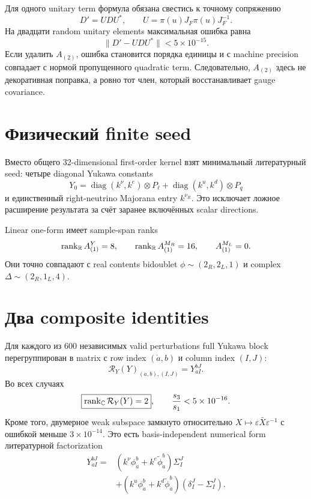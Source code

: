 Для одного unitary term формула обязана свестись к точному сопряжению
\begin{equation}
 D'=UDU^*,
 \qquad
 U=\pi(u)J_F\pi(u)J_F^{-1}.
\end{equation}
На двадцати random unitary elements максимальная ошибка равна
\begin{equation}
 \|D'-UDU^*\|<5\times10^{-15}.
\end{equation}
Если удалить \(A_{(2)}\), ошибка становится порядка единицы и с machine
precision совпадает с нормой пропущенного quadratic term. Следовательно,
\(A_{(2)}\) здесь не декоративная поправка, а ровно тот член, который
восстанавливает gauge covariance.

\section{Физический finite seed}

Вместо общего 32-dimensional first-order kernel взят минимальный
литературный seed: четыре diagonal Yukawa constants
\begin{equation}
 Y_0=\operatorname{diag}(k^\nu,k^e)\otimes P_\ell
 +\operatorname{diag}(k^u,k^d)\otimes P_q
\end{equation}
и единственный right-neutrino Majorana entry \(k^{\nu_R}\). Это исключает
ложное расширение результата за счёт заранее включённых scalar directions.

Linear one-form имеет sample-span ranks
\begin{equation}
 \operatorname{rank}_\mathbb R A_{(1)}^{Y}=8,
 \qquad
 \operatorname{rank}_\mathbb R A_{(1)}^{M_R}=16,
 \qquad
 A_{(1)}^{M_L}=0.
\end{equation}
Они точно совпадают с real contents bidoublet
\(\phi\sim(2_R,2_L,1)\) и complex
\(\Delta\sim(2_R,1_L,4)\).

\section{Два composite identities}

Для каждого из 600 независимых valid perturbations full Yukawa block
перегруппирован в matrix с row index \((\dot a,b)\) и column index \((I,J)\):
\begin{equation}
 \mathcal R_Y(Y)_{(\dot a,b),(I,J)}=Y_{\dot a I}^{bJ}.
\end{equation}
Во всех случаях
\begin{equation}
 \boxed{\operatorname{rank}_\mathbb C\mathcal R_Y(Y)=2},
 \qquad
 \frac{s_3}{s_1}<5\times10^{-16}.
\end{equation}
Кроме того, двумерное weak subspace замкнуто относительно
\(X\mapsto\varepsilon\bar X\varepsilon^{-1}\) с ошибкой меньше
\(3\times10^{-14}\). Это есть basis-independent numerical form
литературной factorization
\begin{align}
 Y_{\dot a I}^{bJ}
 ={}&(k^\nu\phi_{\dot a}^{b}+k^e\widetilde\phi_{\dot a}^{b})
 \Sigma_I^{J}\nonumber\\
 &+(k^u\phi_{\dot a}^{b}+k^d\widetilde\phi_{\dot a}^{b})
 (\delta_I^J-\Sigma_I^J).
 \label{eq:ps-composite-yukawa-confirmed}
\end{align}

